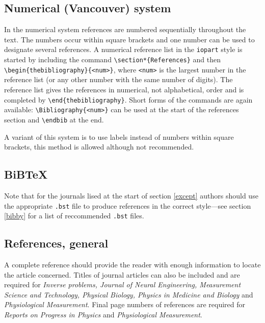 \documentclass[12pt]{iopart}
\begin{document}
\subsection{Numerical (Vancouver) system}
In the numerical system references are numbered sequentially 
throughout the text. The numbers occur within square brackets and one 
number can be used to designate several references. A numerical 
reference list in the \verb"iopart" style is started by including the 
command \verb"\section*{References}" and then
\verb"\begin{thebibliography}{<num>}", where \verb"<num>" is the largest
number in the reference list (or any other number with the same number
of digits).  The 
reference list gives the references in 
numerical, not alphabetical, order and is completed by
\verb"\end{thebibliography}". Short forms of the commands are again
available: \verb"\Bibliography{<num>}" can be used at the start of the
references section and \verb"\endbib" at the end.

A variant of this system is to use labels instead of numbers within 
square brackets, this method is allowed although not recommended.

\subsection{BiBTeX\label{bibtex}}
Note that for the journals lised at the start of section {\ref{except}} authors should use the
appropriate \verb".bst" file to produce references in the correct style---see section \ref{bibby} for
a list of reccommended \verb".bst" files.

\subsection{References, general}
A complete reference should provide the reader with enough information to 
locate the article concerned. Titles of journal articles can also be included and are required for {\it Inverse problems, Journal of Neural Engineering, Measurement Science and Technology, Physical Biology, Physics in Medicine and Biology\/} and {\it Physiological Measurement}. Final page numbers of references are required for {\it Reports on Progress in Physics\/} and {\it Physiological Measurement}.
\end{document}
